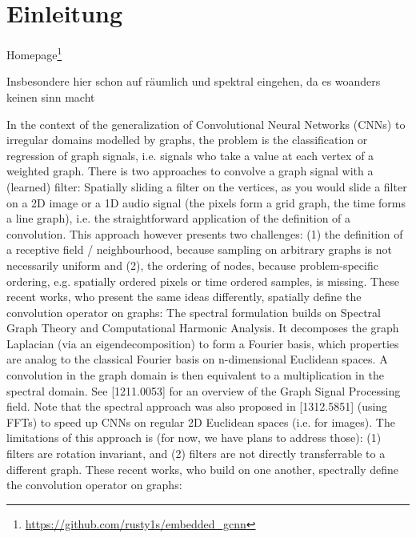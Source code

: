 \chapter{Einleitung}
\label{einleitung}

Homepage\footnote{\url{https://github.com/rusty1s/embedded\_gcnn}}

Insbesondere hier schon auf räumlich und spektral eingehen, da es woanders keinen sinn macht

In the context of the generalization of Convolutional Neural Networks (CNNs) to irregular domains modelled by graphs, the problem is the classification or regression of graph signals, i.e. signals who take a value at each vertex of a weighted graph. There is two approaches to convolve a graph signal with a (learned) filter:
Spatially sliding a filter on the vertices, as you would slide a filter on a 2D image or a 1D audio signal (the pixels form a grid graph, the time forms a line graph), i.e. the straightforward application of the definition of a convolution. This approach however presents two challenges: (1) the definition of a receptive field / neighbourhood, because sampling on arbitrary graphs is not necessarily uniform and (2), the ordering of nodes, because problem-specific ordering, e.g. spatially ordered pixels or time ordered samples, is missing. These recent works, who present the same ideas differently, spatially define the convolution operator on graphs:
The spectral formulation builds on Spectral Graph Theory and Computational Harmonic Analysis. It decomposes the graph Laplacian (via an eigendecomposition) to form a Fourier basis, which properties are analog to the classical Fourier basis on n-dimensional Euclidean spaces. A convolution in the graph domain is then equivalent to a multiplication in the spectral domain. See [1211.0053] for an overview of the Graph Signal Processing field. Note that the spectral approach was also proposed in [1312.5851] (using FFTs) to speed up CNNs on regular 2D Euclidean spaces (i.e. for images). The limitations of this approach is (for now, we have plans to address those): (1) filters are rotation invariant, and (2) filters are not directly transferrable to a different graph. These recent works, who build on one another, spectrally define the convolution operator on graphs:



